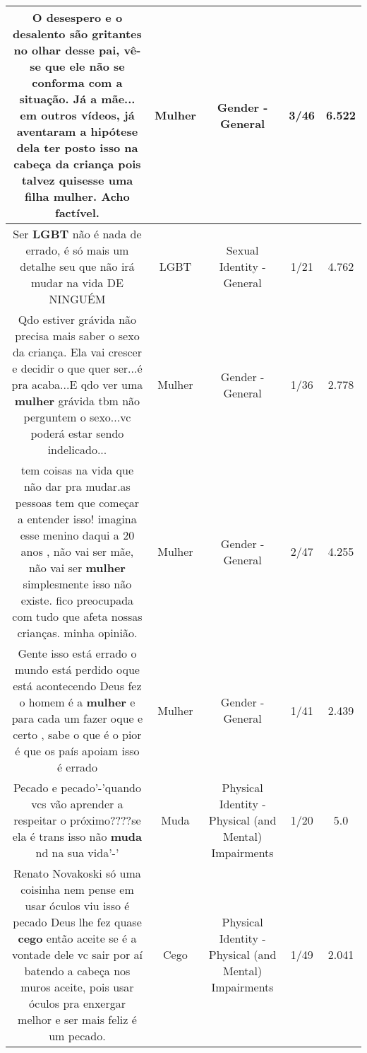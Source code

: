 \documentclass[11pt]{article}
\newlength\mylength
\begin{document}
\begin{center}
\begin{longtable}{|C{.65\mylength}|C{.30\mylength}|C{.12\mylength}|C{.12\mylength}|C{.12\mylength}|}
  \small O desespero e o desalento são gritantes no olhar desse pai, vê-se que ele não se conforma com a situação. Já a mãe... em outros vídeos, já aventaram a hipótese dela ter posto isso na cabeça da criança pois talvez quisesse uma filha \textbf{mulher}. Acho factível.\normalsize   & Mulher & Gender - General & 3/46 & 6.522 \\  \hline
  \small Ser \textbf{LGBT} não é nada de errado, é só mais um detalhe seu que não irá mudar na vida DE NINGUÉM\normalsize   & LGBT & Sexual Identity - General & 1/21 & 4.762 \\  \hline
  \small Qdo estiver grávida não precisa mais saber o sexo da criança. Ela vai crescer e decidir o que quer ser...é pra acaba...E qdo ver uma \textbf{mulher} grávida tbm não perguntem o sexo...vc poderá estar sendo indelicado...\normalsize   & Mulher & Gender - General & 1/36 & 2.778 \\  \hline
  \small tem coisas na vida que não dar pra mudar.as pessoas tem que começar a entender isso! imagina esse menino  daqui a 20 anos , não vai ser mãe, não vai ser \textbf{mulher} simplesmente  isso não existe. fico preocupada com tudo que afeta nossas crianças. minha opinião.\normalsize   & Mulher & Gender - General & 2/47 & 4.255 \\  \hline
  \small Gente isso está errado o mundo está perdido oque está acontecendo Deus fez o homem é a \textbf{mulher} e para cada um fazer oque e certo , sabe o que é o pior é que os país apoiam isso é errado\normalsize   & Mulher & Gender - General & 1/41 & 2.439 \\  \hline
  \small Pecado e pecado'-'quando vcs vão aprender a respeitar o próximo????se ela é trans isso não \textbf{muda} nd na sua vida'-'\normalsize   & Muda & Physical Identity - Physical (and Mental) Impairments & 1/20 & 5.0 \\  \hline
  \small Renato Novakoski só uma coisinha nem pense em usar óculos viu isso é pecado Deus lhe fez quase \textbf{cego} então aceite se é a vontade dele vc sair por aí batendo a cabeça nos muros aceite, pois usar óculos pra enxergar melhor e ser mais feliz é um pecado.\normalsize   & Cego & Physical Identity - Physical (and Mental) Impairments & 1/49 & 2.041 \\  \hline

\end{longtable}
\end{center}
\end{document}
